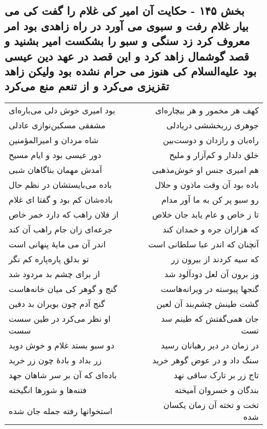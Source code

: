 \begin{center}
\section*{بخش ۱۴۵ - حکایت آن امیر کی غلام را گفت کی می بیار غلام رفت و سبوی می آورد در راه زاهدی بود امر معروف کرد زد سنگی و سبو را بشکست امیر بشنید و قصد گوشمال زاهد کرد و این قصد در عهد دین عیسی بود علیه‌السلام کی هنوز می حرام نشده بود ولیکن زاهد تقزیزی می‌کرد و از تنعم منع می‌کرد}
\label{sec:sh145}
\begin{longtable}{l p{0.5cm} r}
بود امیری خوش دلی می‌باره‌ای
&&
کهف هر مخمور و هر بیچاره‌ای
\\
مشفقی مسکین‌نوازی عادلی
&&
جوهری زربخششی دریادلی
\\
شاه مردان و امیرالمؤمنین
&&
راه‌بان و رازدان و دوست‌بین
\\
دور عیسی بود و ایام مسیح
&&
خلق دلدار و کم‌آزار و ملیح
\\
آمدش مهمان بناگاهان شبی
&&
هم امیری جنس او خوش‌مذهبی
\\
باده می‌بایستشان در نظم حال
&&
باده بود آن وقت ماذون و حلال
\\
باده‌شان کم بود و گفتا ای غلام
&&
رو سبو پر کن به ما آور مدام
\\
از فلان راهب که دارد خمر خاص
&&
تا ز خاص و عام یابد جان خلاص
\\
جرعه‌ای زان جام راهب آن کند
&&
که هزاران جره و خمدان کند
\\
اندر آن می مایهٔ پنهانی است
&&
آنچنان که اندر عبا سلطانی است
\\
تو بدلق پاره‌پاره کم نگر
&&
که سیه کردند از بیرون زر
\\
از برای چشم بد مردود شد
&&
وز برون آن لعل دودآلود شد
\\
گنج و گوهر کی میان خانه‌هاست
&&
گنجها پیوسته در ویرانه‌هاست
\\
گنج آدم چون بویران بد دفین
&&
گشت طینش چشم‌بند آن لعین
\\
او نظر می‌کرد در طین سست سست
&&
جان همی‌گفتش که طینم سد تست
\\
دو سبو بستد غلام و خوش دوید
&&
در زمان در دیر رهبانان رسید
\\
زر بداد و بادهٔ چون زر خرید
&&
سنگ داد و در عوض گوهر خرید
\\
باده‌ای که آن بر سر شاهان جهد
&&
تاج زر بر تارک ساقی نهد
\\
فتنه‌ها و شورها انگیخته
&&
بندگان و خسروان آمیخته
\\
استخوانها رفته جمله جان شده
&&
تخت و تخته آن زمان یکسان شده
\\

\end{longtable}
\end{center}
